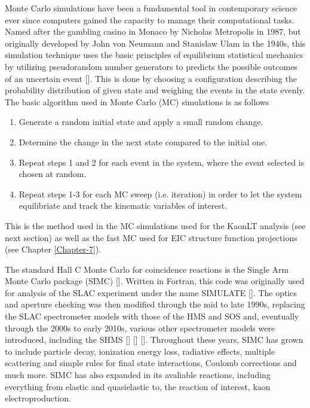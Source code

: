 \documentclass[
]{report}
\begin{document}
\label{Chapter-4}

Monte Carlo simulations have been a fundamental tool in contemporary
science ever since computers gained the capacity to manage their
computational tasks. Named after the gambling casino in Monaco by
Nicholas Metropolis in 1987, but originally developed by John von
Neumann and Stanislaw Ulam in the 1940s, this simulation technique uses
the basic principles of equilibrium statistical mechanics by utilizing
pseudorandom number generators to predicts the possible outcomes of an
uncertain event {[}\cite{pathria_statistical_2011}{]}. This is done by
choosing a configuration describing the probability distribution of
given state and weighing the events in the state evenly. The basic
algorithm used in Monte Carlo (MC) simulations is as follows

\begin{enumerate}
\item Generate a random initial state and apply a small random change.
\item Determine the change in the next state compared to the initial one.
\item Repeat steps 1 and 2 for each event in the system, where the event selected is chosen at random.
\item Repeat steps 1-3 for each MC sweep (i.e. iteration) in order to let the system equilibriate and track the kinematic variables of interest.
\end{enumerate}

\noindent This is the method used in the MC simulations used for the
KaonLT analysis (see next section) as well as the fast MC used for EIC
structure function projections (see Chapter \ref{Chapter-7}).

\label{Chapter-3-6}

The standard Hall C Monte Carlo for coincidence reactions is the Single
Arm Monte Carlo package (SIMC) {[}\cite{gaskell_github_2023}{]}. Written
in Fortran, this code was originally used for analysis of the SLAC
experiment under the name SIMULATE
{[}\cite{arrington_inclusive_1998}{]}. The optics and aperture checking
was then modified through the mid to late 1990s, replacing the SLAC
spectrometer models with those of the HMS and SOS and, eventually
through the 2000s to early 2010s, various other spectrometer models were
introduced, including the SHMS
{[}\cite{12_gev_upgrade_pcdr_editorial_board_pre-conceptual_2004}{]}
{[}\cite{gaskell_simc_2009}{]} {[}\cite{arrington_-b-simc_2001}{]}.
Throughout these years, SIMC has grown to include particle decay,
ionization energy loss, radiative effects, multiple scattering and
simple rules for final state interactions, Coulomb corrections and much
more. SIMC has also expanded in its avaliable reactions, including
everything from elastic and quasielastic to, the reaction of interest,
kaon electroproduction.
\end{document}
